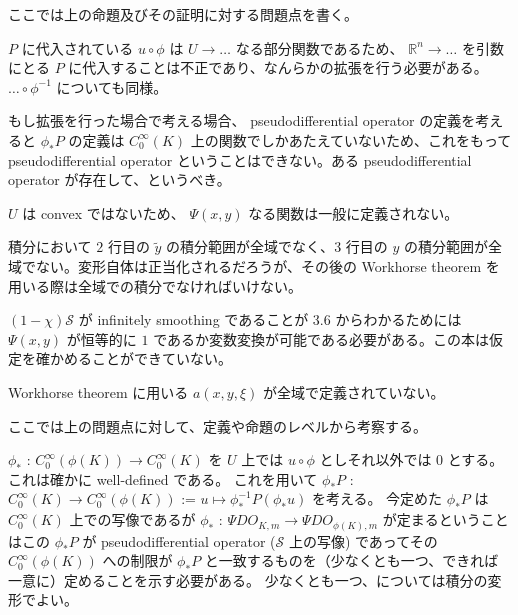 \documentclass[dvipdfmx]{jsarticle}
\begin{document}
\begin{Remark}
\item[] ここでは上の命題及びその証明に対する問題点を書く。
\item \(P\) に代入されている \(u \circ \phi\) は \(U \to \ldots\) なる部分関数であるため、 \(\mathbb{R}^n \to \ldots\) を引数にとる \(P\) に代入することは不正であり、なんらかの拡張を行う必要がある。 \(\ldots \circ \phi^{-1}\) についても同様。
\item もし拡張を行った場合で考える場合、 pseudodifferential operator の定義を考えると \(\phi_* P\) の定義は \(C^\infty_0(K)\) 上の関数でしかあたえていないため、これをもって pseudodifferential operator ということはできない。ある pseudodifferential operator が存在して、というべき。
\item \(U\) は convex ではないため、 \(\Psi(x,y)\) なる関数は一般に定義されない。
\item 積分において \(2\) 行目の \(\tilde{y}\) の積分範囲が全域でなく、\(3\) 行目の \(y\) の積分範囲が全域でない。変形自体は正当化されるだろうが、その後の Workhorse theorem を用いる際は全域での積分でなければいけない。
\item \((1 - \chi) \mathscr{S}\) が infinitely smoothing であることが 3.6 からわかるためには \(\Psi(x,y)\) が恒等的に \(1\) であるか変数変換が可能である必要がある。この本は仮定を確かめることができていない。
\item Workhorse theorem に用いる \(a(x,y,\xi)\) が全域で定義されていない。
\end{Remark}

ここでは上の問題点に対して、定義や命題のレベルから考察する。

\(\phi_*\) : \(C^\infty_0(\phi(K)) \to C^\infty_0(K)\) を \(U\) 上では \(u \circ \phi\) としそれ以外では \(0\) とする。
これは確かに well-defined である。
これを用いて \(\phi_* P\) : \(C^\infty_0(K) \to C^\infty_0(\phi(K))\) := \(u \mapsto \phi_*^{-1} P(\phi_* u)\) を考える。
今定めた \(\phi_* P\) は \(C^\infty_0(K)\) 上での写像であるが \(\phi_*\) : \(\Psi DO_{K,m} \to \Psi DO_{\phi(K),m}\) が定まるということはこの \(\phi_* P\) が pseudodifferential operator (\(\mathscr{S}\) 上の写像) であってその \(C^\infty_0(\phi(K))\) への制限が \(\phi_* P\) と一致するものを（少なくとも一つ、できれば一意に）定めることを示す必要がある。
少なくとも一つ、については積分の変形でよい。
\end{document}
